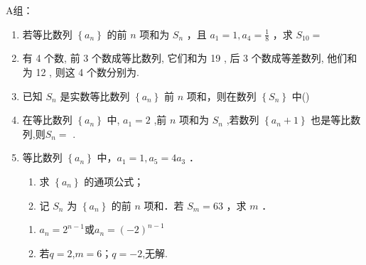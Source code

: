 A组：
\begin{enumerate}
    \item 若等比数列 $\left\{a_n\right\}$ 的前 $n$ 项和为 $S_n$ ，且 $a_1=1, a_4=\frac{1}{8}$ ，求 $S_{10}=$ 

    \item 有 4 个数, 前 3 个数成等比数列, 它们和为 19 , 后 3 个数成等差数列, 他们和为 12 , 则这 4 个数分别为.

    \item 已知 $S_n$ 是实数等比数列 $\left\{a_n\right\}$ 前 $n$ 项和，则在数列 $\left\{S_n\right\}$ 中\dotfill{}()


    \item 在等比数列 $\left\{  {a}_{n}\right\}$ 中, ${a}_{1} = 2$ ,前 $n$ 项和为 ${S}_{n}$ ,若数列 $\left\{  {{a}_{n} + 1}\right\}$ 也是等比数列,则${S}_{n} =$ .

    \item 等比数列 $\left\{a_n\right\}$ 中，$a_1=1, a_5=4 a_3$ ．
    \begin{enumerate}
        \item 求 $\left\{a_n\right\}$ 的通项公式；
        \item 记 $S_n$ 为 $\left\{a_n\right\}$ 的前 $n$ 项和．若 $S_m=63$ ，求 $m$ ．
    \end{enumerate}
\begin{jieda}
    \begin{enumerate}
        \item $a_n=2^{n-1}$或$a_n=(-2)^{n-1}$
        \item 若$q=2$,$m=6$；$q=-2$,无解.
    \end{enumerate}
\end{jieda}

\end{enumerate}


